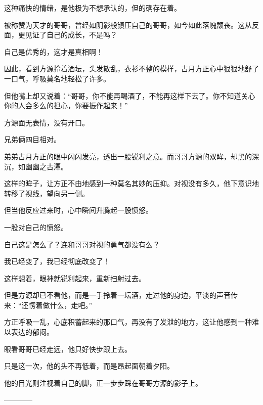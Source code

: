 \begin{this_body}
这种痛快的情绪，是他极为不想承认的，但的确存在着。

被称赞为天才的哥哥，曾经如阴影般镇压自己的哥哥，如今如此落魄颓丧。这从反面，更见证了自己的成长，不是吗？

自己是优秀的，这才是真相啊！

因此，看到方源拎着酒坛，头发散乱，衣衫不整的模样，古月方正心中狠狠地舒了一口气，呼吸莫名地轻松了许多。

但他嘴上却又说着：“哥哥，你不能再喝酒了，不能再这样下去了。你不知道关心你的人会多么的担心，你要振作起来！”

方源面无表情，没有开口。

兄弟俩四目相对。

弟弟古月方正的眼中闪闪发亮，透出一股锐利之意。而哥哥方源的双眸，却黑的深沉，如幽幽之古潭。

这样的眸子，让方正不由地感到一种莫名其妙的压抑。对视没有多久，他下意识地转移了视线，望向另一侧。

但当他反应过来时，心中瞬间升腾起一股愤怒。

一股对自己的愤怒。

自己这是怎么了？连和哥哥对视的勇气都没有么？

我已经变了，我已经彻底改变了！

这样想着，眼神就锐利起来，重新扫射过去。

但是方源却已不看他，而是一手拎着一坛酒，走过他的身边，平淡的声音传来：“还愣着做什么，走吧。”

方正呼吸一乱，心底积蓄起来的那口气，再没有了发泄的地方，这让他感到一种难以表达的郁闷。

眼看哥哥已经走远，他只好快步跟上去。

只是这一次，他的头不再低着，而是昂起面朝着夕阳。

他的目光则注视着自己的脚，正一步步踩在哥哥方源的影子上。

------------

\end{this_body}


